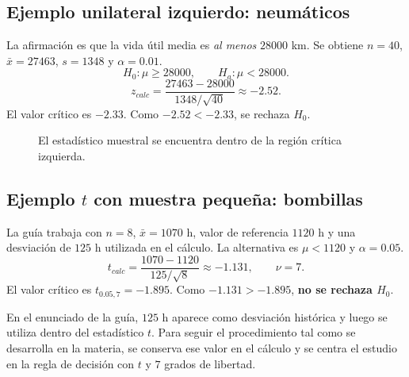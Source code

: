 \documentclass[11pt,a4paper]{article}
\begin{document}
\subsection{Ejemplo unilateral izquierdo: neumáticos}

La afirmación es que la vida útil media es \emph{al menos} $28000$ km. Se obtiene $n=40$, $\bar{x}=27463$, $s=1348$ y $\alpha=0.01$.
\[
H_0:\mu\ge28000,
\qquad
H_a:\mu<28000.
\]
\[
z_{calc}=\frac{27463-28000}{1348/\sqrt{40}}\approx-2.52.
\]
El valor crítico es $-2.33$. Como $-2.52<-2.33$, se rechaza $H_0$.

\begin{figure}[H]
\centering
{}
\caption{El estadístico muestral se encuentra dentro de la región crítica izquierda.}
\end{figure}

\subsection{Ejemplo $t$ con muestra pequeña: bombillas}

La guía trabaja con $n=8$, $\bar{x}=1070$ h, valor de referencia $1120$ h y una desviación de $125$ h utilizada en el cálculo. La alternativa es $\mu<1120$ y $\alpha=0.05$.
\[
t_{calc}=\frac{1070-1120}{125/\sqrt8}\approx-1.131,
\qquad \nu=7.
\]
El valor crítico es $t_{0.05,7}=-1.895$. Como $-1.131>-1.895$, \textbf{no se rechaza $H_0$}.

\begin{aclaracion}
En el enunciado de la guía, $125$ h aparece como desviación histórica y luego se utiliza dentro del estadístico $t$. Para seguir el procedimiento tal como se desarrolla en la materia, se conserva ese valor en el cálculo y se centra el estudio en la regla de decisión con $t$ y $7$ grados de libertad.
\end{aclaracion}
\end{document}
